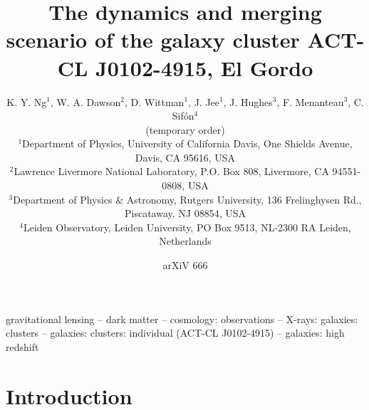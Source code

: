 


\title[The dynamics and merging scenario of ACT-CL
J0102-4915, El Gordo]{The dynamics and merging scenario of the galaxy cluster 
ACT-CL J0102-4915, 
El Gordo}
\author[K. Y. Ng et al.]{K. Y. Ng$^{1}$, W. A. Dawson$^{2}$, D. Wittman$^{1}$, J.
Jee$^{1}$, J. Hughes$^{3}$, F. Menanteau$^{3}$, C. Sif\'{o}n$^{4}$\\
(temporary order)\\
$^{1}$Department of Physics, University of California Davis, One Shields
Avenue, Davis, CA 95616, USA\\ 
$^{2}$Lawrence Livermore National Laboratory, P.O. Box 808, Livermore, CA
94551-0808, USA \\
$^3$Department of Physics \& Astronomy,
Rutgers University, 136 Frelinghysen Rd., Piscataway, NJ 08854, USA\\
$^{4}$Leiden Observatory, Leiden University, PO Box 9513, NL-2300 RA
Leiden, Netherlands\\}


\date{arXiV 666} \pagerange{\pageref{firstpage}--\pageref{lastpage}}
 \maketitle \label{firstpage}
\begin{abstract} 
    
\end{abstract}
\begin{keywords}
gravitational lensing -- dark matter -- cosmology: observations -- X-rays:
galaxies: clusters -- galaxies: clusters: individual (ACT-CL J0102-4915) --
galaxies: high redshift 
\end{keywords}

\section{Introduction} 


